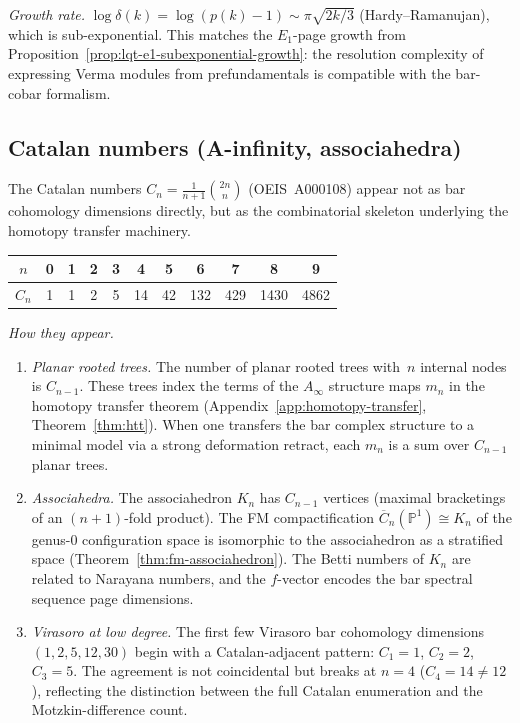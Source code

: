 \emph{Growth rate.}
$\log\delta(k) = \log(p(k)-1) \sim \pi\sqrt{2k/3}$
(Hardy--Ramanujan), which is sub-exponential. This matches the
$E_1$-page growth from
Proposition~\ref{prop:lqt-e1-subexponential-growth}:
the resolution complexity of expressing Verma modules from
prefundamentals is compatible with the bar-cobar formalism.

\subsection{Catalan numbers (A-infinity, associahedra)}
\label{subsec:catalan}

The Catalan numbers $C_n = \frac{1}{n+1}\binom{2n}{n}$ (OEIS~A000108) appear not as bar cohomology dimensions directly, but as the combinatorial skeleton underlying the homotopy transfer machinery.

\begin{center}
\renewcommand{\arraystretch}{1.2}
\begin{tabular}{c|cccccccccc}
$n$ & 0 & 1 & 2 & 3 & 4 & 5 & 6 & 7 & 8 & 9 \\
\hline
$C_n$ & 1 & 1 & 2 & 5 & 14 & 42 & 132 & 429 & 1430 & 4862
\end{tabular}
\end{center}

\emph{How they appear.}

\begin{enumerate}[label=(\roman*)]
\item \emph{Planar rooted trees.} The number of planar rooted trees with~$n$ internal nodes is $C_{n-1}$. These trees index the terms of the $A_\infty$ structure maps $m_n$ in the homotopy transfer theorem (Appendix~\ref{app:homotopy-transfer}, Theorem~\ref{thm:htt}). When one transfers the bar complex structure to a minimal model via a strong deformation retract, each $m_n$ is a sum over $C_{n-1}$ planar trees.

\item \emph{Associahedra.} The associahedron $K_n$ has $C_{n-1}$ vertices (maximal bracketings of an $(n+1)$-fold product). The FM compactification $\overline{C}_n(\mathbb{P}^1) \cong K_n$ of the genus-$0$ configuration space is isomorphic to the associahedron as a stratified space (Theorem~\ref{thm:fm-associahedron}). The Betti numbers of $K_n$ are related to Narayana numbers, and the $f$-vector encodes the bar spectral sequence page dimensions.

\item \emph{Virasoro at low degree.} The first few Virasoro bar cohomology dimensions $(1, 2, 5, 12, 30)$ begin with a Catalan-adjacent pattern: $C_1 = 1$, $C_2 = 2$, $C_3 = 5$. The agreement is not coincidental but breaks at $n = 4$ ($C_4 = 14 \neq 12$), reflecting the distinction between the full Catalan enumeration and the Motzkin-difference count.
\end{enumerate}

